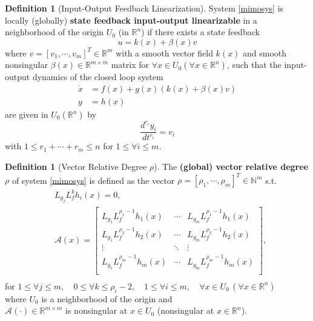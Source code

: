 \documentclass[11pt, a4paper, oneside, openany, reqno]{book}
\theoremstyle{definition}
\newtheorem{definition}[theorem]{Definition}
\theoremstyle{remark}
\numberwithin{equation}{chapter} %
\newcommand{\R}{\ensuremath{{\mathbb R}}}
\newcommand{\N}{\ensuremath{{\mathbb N}}}
\newcommand{\A}{\mathcal{A}}
\begin{document}
\begin{definition}[Input-Output Feedback Linearization]
	System \eqref{mimosys} is locally (globally) \textbf{state feedback input-output linearizable} 
	in a neighborhood of the origin $ U_0 $ (in $ \R^n $) if there exists a state feedback
	\begin{equation}
	u=k(x)+\beta(x)v
	\end{equation}
	where $v=\left[v_1 ,\cdots ,v_m\right]^T  \in \R^m $ with a smooth vector field $k(x)$ 
	and smooth nonsingular $\beta(x) \in \R^{m \times m}$  matrix 
	for $ \forall x \in U_0 ( \forall x \in \R^n) $,
	such that the input-output dynamics of the closed loop system
	\begin{equation}\begin{split}\label{mimolsys}
	\dot{x}&= f(x) +g(x)(k(x)+\beta(x)v) \\
	y&= h(x)
	\end{split}\end{equation} 
	are given in $ U_0 ( \R^n )$ by 
	\[ \frac{d^{r_{i}}y_i}{dt^{r_i}} = v_i \] with $ 1 \leq r_1 + \cdots + r_m \leq n $ 
	for  $ 1 \leq \forall i \leq m $.
\end{definition}


\begin{definition}[Vector Relative Degree $\rho$]
	The \textbf{(global) vector relative degree $\rho$ }of system \eqref{mimosys} is defined as 
	the vector $ \rho=\left[ \rho_1,\cdots,\rho_m \right]^T \in \N^{m} $ s.t. 
	\begin{equation}\begin{split}
	& L_{g_{j}} L_f^k h_i (x) =0, \\
	& \A (x)=\left[\begin{array}{ccc}
	L_{g_1} L_f^{\rho_1 -1} h_1 (x) & \cdots & L_{g_m} L_f^{\rho_1 -1} h_1 (x)\\
	L_{g_1} L_f^{\rho_2 -1} h_2 (x) & \cdots & L_{g_m} L_f^{\rho_2 -1} h_2 (x)\\
	\vdots & \ddots & \vdots\\
	L_{g_1} L_f^{\rho_m -1} h_m (x) & \cdots & L_{g_m} L_f^{\rho_m -1} h_m (x)\\\end{array}\right], \\
	\end{split}\end{equation} 
	for  $ 1 \leq \forall j \leq m ,\quad 0\leq \forall  k \leq \rho_i -2 , 
	\quad 1 \leq \forall i \leq m, \quad \forall x  \in U_0 \,(\forall x \in \R^n ) $ \\
	where $ U_0 $ is a neighborhood of the origin and\\
	$ \A (\cdot) \in \R^{m \times m}$ is nonsingular at $ x \in U_0 $ (nonsingular at $ x \in \R^n $). 
\end{definition}
\end{document}

